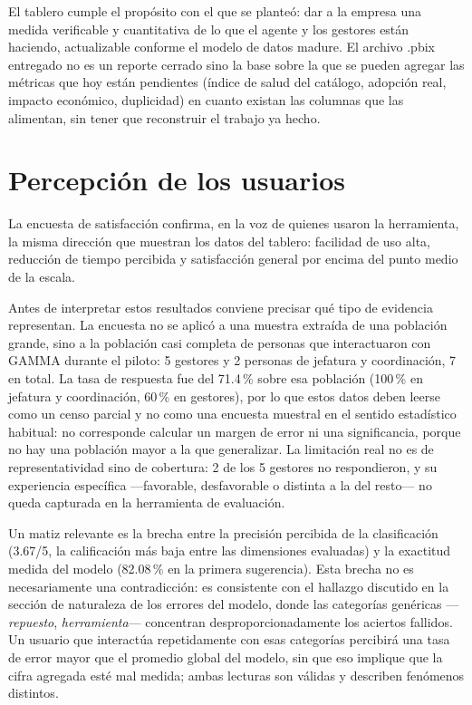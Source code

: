 El tablero cumple el propósito con el que se planteó: dar a la empresa una medida verificable y cuantitativa de lo que el agente y los gestores están haciendo, actualizable conforme el modelo de datos madure. El archivo .pbix entregado no es un reporte cerrado sino la base sobre la que se pueden agregar las métricas que hoy están pendientes (índice de salud del catálogo, adopción real, impacto económico, duplicidad) en cuanto existan las columnas que las alimentan, sin tener que reconstruir el trabajo ya hecho.

\section{Percepción de los usuarios}
La encuesta de satisfacción confirma, en la voz de quienes usaron la herramienta, la misma dirección que muestran los datos del tablero: facilidad de uso alta, reducción de tiempo percibida y satisfacción general por encima del punto medio de la escala.

Antes de interpretar estos resultados conviene precisar qué tipo de evidencia representan. La encuesta no se aplicó a una muestra extraída de una población grande, sino a la población casi completa de personas que interactuaron con GAMMA durante el piloto: 5 gestores y 2 personas de jefatura y coordinación, 7 en total. La tasa de respuesta fue del 71.4\,\% sobre esa población (100\,\% en jefatura y coordinación, 60\,\% en gestores), por lo que estos datos deben leerse como un censo parcial y no como una encuesta muestral en el sentido estadístico habitual: no corresponde calcular un margen de error ni una significancia, porque no hay una población mayor a la que generalizar. La limitación real no es de representatividad sino de cobertura: 2 de los 5 gestores no respondieron, y su experiencia específica —favorable, desfavorable o distinta a la del resto— no queda capturada en la herramienta de evaluación.


Un matiz relevante es la brecha entre la precisión percibida de la clasificación (3.67/5, la calificación más baja entre las dimensiones evaluadas) y la exactitud medida del modelo (82.08\,\% en la primera sugerencia). Esta brecha no es necesariamente una contradicción: es consistente con el hallazgo discutido en la sección de naturaleza de los errores del modelo, donde las categorías genéricas —\textit{repuesto}, \textit{herramienta}— concentran desproporcionadamente los aciertos fallidos. Un usuario que interactúa repetidamente con esas categorías percibirá una tasa de error mayor que el promedio global del modelo, sin que eso implique que la cifra agregada esté mal medida; ambas lecturas son válidas y describen fenómenos distintos.

